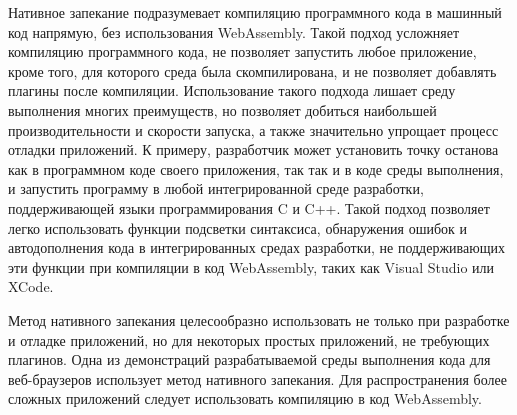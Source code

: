 Нативное запекание подразумевает компиляцию программного кода в машинный код напрямую, без использования WebAssembly.
Такой подход усложняет компиляцию программного кода, не позволяет запустить любое приложение, кроме того, для которого среда была скомпилирована, и не позволяет добавлять плагины после компиляции.
Использование такого подхода лишает среду выполнения многих преимуществ, но позволяет добиться наибольшей производительности и скорости запуска, а также значительно упрощает процесс отладки приложений.
К примеру, разработчик может установить точку останова как в программном коде своего приложения, так так и в коде среды выполнения, и запустить программу в любой интегрированной среде разработки, поддерживающей языки программирования C и C++.
Такой подход позволяет легко использовать функции подсветки синтаксиса, обнаружения ошибок и автодополнения кода в интегрированных средах разработки, не поддерживающих эти функции при компиляции в код WebAssembly, таких как Visual Studio или XCode.

Метод нативного запекания целесообразно использовать не только при разработке и отладке приложений, но для некоторых простых приложений, не требующих плагинов.
Одна из демонстраций разрабатываемой среды выполнения кода для веб-браузеров использует метод нативного запекания.
Для распространения более сложных приложений следует использовать компиляцию в код WebAssembly.
